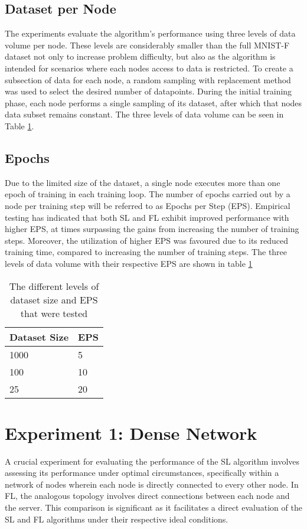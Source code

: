 \subsection{Dataset per Node}
The experiments evaluate the algorithm's performance using three levels of data volume per node. These levels are considerably smaller than the full MNIST-F dataset not only to increase problem difficulty, but also as the algorithm is intended for scenarios where each nodes access to data is restricted. To create a subsection of data for each node, a random sampling with replacement method was used to select the desired number of datapoints. During the initial training phase, each node performs a single sampling of its dataset, after which that nodes data subset remains constant. The three levels of data volume can be seen in Table \ref{epsparams}.

\subsection{Epochs}
Due to the limited size of the dataset, a single node executes more than one epoch of training in each training loop. The number of epochs carried out by a node per training step will be referred to as Epochs per Step (EPS). Empirical testing has indicated that both SL and FL exhibit improved performance with higher EPS, at times surpassing the gains from increasing the number of training steps. Moreover, the utilization of higher EPS was favoured due to its reduced training time, compared to increasing the number of training steps. The three levels of data volume with their respective EPS are shown in table \ref{epsparams}

\begin{table}[H]
	\centering
	\begin{tabular}{l|l}
		Dataset Size & EPS \\ \hline \hline
		1000   & 5  \\ \hline
		100   & 10  \\ \hline
		25  & 20 
	\end{tabular}
	\caption{The different levels of dataset size and EPS that were tested} \label{epsparams}
\end{table}

\section{Experiment 1: Dense Network}
A crucial experiment for evaluating the performance of the SL algorithm involves assessing its performance under optimal circumstances, specifically within a network of nodes wherein each node is directly connected to every other node. In FL, the analogous topology involves direct connections between each node and the server. This comparison is significant as it facilitates a direct evaluation of the SL and FL algorithms under their respective ideal conditions.

